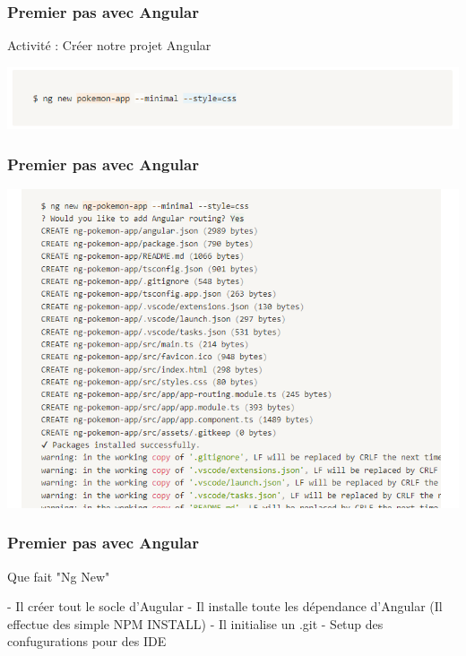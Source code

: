 \documentclass[10pt]{beamer}
\begin{document}
	\begin{frame}
		\frametitle{Premier pas avec Angular}

		Activité : \newline
		Créer notre projet Angular \newline \newline

		\includegraphics[width=17cm]{assets/angularsetup} \newline \newline

	\end{frame}

	\begin{frame}
		\frametitle{Premier pas avec Angular}

		\includegraphics[width=15cm]{assets/angularsetup2} \newline \newline

	\end{frame}

	\begin{frame}
		\frametitle{Premier pas avec Angular}

		Que fait "Ng New" \newline \newline

		- Il créer tout le socle d'Augular\newline
		- Il installe toute les dépendance d'Angular (Il effectue des simple NPM INSTALL)\newline
		- Il initialise un .git \newline
		- Setup des confugurations pour des IDE\newline

	\end{frame}
\end{document}
